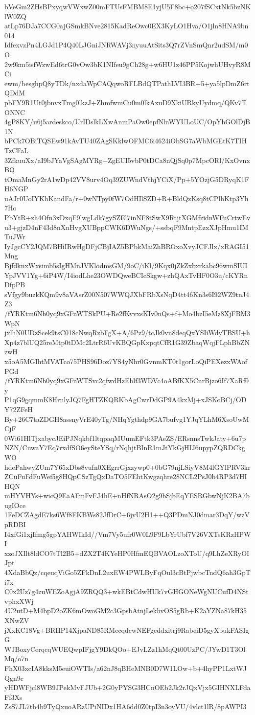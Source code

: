 bVeGm2ZHsBPxyqwVWxwZ00mFTUsFMBM8E1yjU5F8bc+o207fSCxtNk5bzNKlW0ZQ
atLp76DJa7CCG0ajGSmkBNve2815KadReOwc0EX3KyLO1Hva/O1jln8HNA9bn014
IdfexvzPn4LGJd1P4Q40LJGniJNRWAVj3nyuuAtSits3Q7rZVnSmQnr2udSM/m0O
2w9km5isfWzwEd6trG0vOw3bK1NIfeu9gCh28g+w6HU1z46PP5KojwhUHvyR8MCi
ewm/besghpQ8yTDk/nxdaWpCAQqwoRFLBdQTPathLVI3BR+5+ya5lpDmZ6rtQDdM
pbFY9R1Ut0jbnvxTmg0lkzJ+ZhmfwmCu0m0lkAxuD9XkiURkyUydmq/QKv7TONNC
4gP8KY/u6j5ardeskco/UrIDslkLXwAnmPaOw0epfNlnWYULoUC/OpYhGOlDjB1N
bPCk7OBiTQSEw91kAvTU40ZAgSKklwOFMC6i4624iObSG7aWbMGEtK7TIHTzCFaL
3ZfkuuXx/aI9bJYaVgSAgMYRg+ZgEUI5vbP0tDCa8nQjSq0p7MpcORl/KxOvnxBQ
tOmaMnGy2rA1wDp42VV8urv4Oq39ZUWndVthjYCiX/Pp+5YOzjG5DRyqK1FH6NGP
uAJr0UoIYKhKandFa/r+0wNTpy0fW7OdHIlSZD+R+BldQzKsq8tCPlhKtp3Yh7Ho
PbYtR+zh4Ofn3xDxqF9lwgLdk7gySZEl7inNF8tSwX9RtjtXGMfzidnWFuCrtwEv
u3+gjzD4nF43d8nXnHvgXUBppCWK6DWuNgs/+ssbqF9MntpEzxXJpHmu1IMTuJWr
IyJgcCY2JQM7BHiIRwHgDFjCBjIAZ5BPbkMaiZhBROxoXvyJCFJlx/xRAGI51Mng
BjfdknxWxsimb5sIgHMnJVKlodmsGM/9oC/iKl/9Kqx0jZkZxbxrkabc96wmSIUI
YpJVV1Yg+6iP4W/I4iodLhe23OWDQweBCIcSkgw+zhQAxTvHF0O3u/cKYRnDfpPB
sVfgy9buzkKQm9v8aVAsrZ00N507WWQJXbFRbXsNqD4tt46Kn3s6I92WZ9tnJ4Z3
/fYRKtm6Nb0yq9xGFnWTSkPU+Re2fKvvxsKIv0nQs+f+Mo4bzI5eMz8XjFBM3WpN
jxlhN0UDzScek9tsC018cNwqRzbFgX+A/6Pz9/tcJk0vn8deqQxYSIiWdyTBSU+h
Xp4z7blUQ25reMtp0tDMc2LtrR6UvKBQGpKxpqtCfR1G39ZbaqWqjFLphBbZNzwH
x5oA5MGIhtMVATco75PHS96Doz7YS4yNhr0GvnmKT0t1gorLoQiPEXezxWAofPGd
/fYRKtm6Nb0yq9xGFnWTSvc2qfwdHzEblf3WDVc4oABfKX5CnrBjzo6If7XaRf0y
P1qG9gqmmK8HrnlyJQ7FgHTZKQRKbAgCwrDdGP9A4kxMj+xJSKoBCj/ODY72ZFeH
By+26C7taZDGH8assnyVrE40yTg/NHqYgthdp9GA7bufvg1YJqYLhM6XsoUwMCjF
0Wi61HlTjxabycJEiPJNqkbf1ltqpaqMUumEFtk3PAeZS/ERsnnsTwkJaty+6u7p
NZN/CuwaY7Eq7rxdfSO6eySteYSq/rNqhjtBInR1mJtYkGjHIJ6upypZQRDCkgWO
hdePahwyZUm7Y65xDbs8vufn0XEgrrGjxzywp0+0bG79njLSiyV8M4lGYlPRV3kr
ZCuFuFdFuWef5g8HQpCSzTgQxDaTO5FEhtKwgzqhre28NCL2PsJ0b4RP3d7HIHQN
mHYVHYs+wicQ9EaAFmFvFJ4hE+nHfNRAsO2g9bSjbEqYESRGbwNjK2BA7bugIOce
1FeDCZAgdE7ks6Wf8EKBWs82JfDrC+6jvU2H1++Q3PDmNJ0dmar3DqY/wzVpRDBI
I4xfGi1xjIfmg5gpYAHWIkId//Vm7Vy5ufr0W0L9F9LbYrUbf7V26VXTsKRzHPWI
xzoJXIlt8ldCO7tTl2B5+dZX2T4KYeHP0HfmEQBVAOLzoXToU/q9LhZeXRyOIJpt
4XdaBbQz/cqeuqViGo5ZFkDnL2uxEW4PWLByFqOul3cBtPjwbcTndQ6ah3GpTi7x
C0x2Uz7g4zuWEZoAgjA9ZRQQ3+wkEBtCdwHUk7vGHGONeWgNUCufD4NStvphxXWj
4U2utD+M4bpD2oZK6mOwoGM2c3GpsbAtnjLekhvOS5gRb+K2aYZNa87kH35XNwZV
jXxKC18Vg+BRHP14XjpaND85RMecqdcwNEFgeddxitrj9RabeiD5gyXbukFASIgG
WJBoxyCerqcqWUEQwpIFjgY9DkQOo+EJvLZz1hMqQt00UzPC/JYwD1T3OlMq/o7n
FhX03xcIA8kksM5euiOWTIs/a62nJ8qBHeMNB0D7W1LOw+b+4hyPP1LxtWJQgn9c
yHDWFjcl8WB9JPekMvFJUb+2G0yPYSG3HCnOEb2Jk2rJQxVjx5GIHNXLFdaFf3Xs
ZsS7JL7tb4b9TyQxuoARzUPiNIDx1HA6dd0Z0tpI3n3oyVU/4vlct1lR/8pAWPI3
